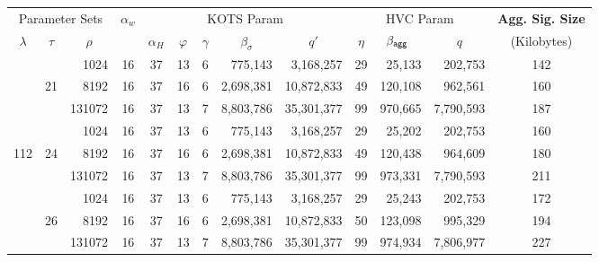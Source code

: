 \begin{table}\centering
    \begin{tabular}{ccr|c|cccrr|crr|c}%
  
      \multicolumn{3}{c|}{Parameter Sets}  
      & \multirow{2}{*}{$\alpha_w$}  
      & \multicolumn{5}{c|}{KOTS Param}  
      & \multicolumn{3}{c|}{HVC Param}  
      &  {\bf Agg. Sig. Size}\\%
      
      $\lambda$      & $\tau$
      & \multicolumn{1}{c|}{$\rho$}&   &$\alpha_H$& $\varphi$ 
      & $\gamma$                      & \multicolumn{1}{c}{$\beta_\sigma$}     
      & \multicolumn{1}{c|}{$q'$}                     & $\eta$       
      & $\beta_{\mathsf{agg}}\quad$                  & \multicolumn{1}{c|}{$q$} 
      & (Kilobytes) \\\toprule
  
  
      &       &   1024 &         16 &        37 &         13 &       6 &        775,143 &  3,168,257 &    29 &       25,133 &   202,753 & 142 \\%
      &    21 &   8192 &         16 &        37 &         16 &       6 &      2,698,381 & 10,872,833 &    49 &      120,108 &   962,561 & 160 \\%
      &       & 131072 &         16 &        37 &         13 &       7 &      8,803,786 & 35,301,377 &    99 &      970,665 & 7,790,593 & 187 \\\cline{2-13}
  
      &       &   1024 &         16 &        37 &         13 &       6 &        775,143 &  3,168,257 &    29 &       25,202 &   202,753 & 160 \\%
  112 &    24 &   8192 &         16 &        37 &         16 &       6 &      2,698,381 & 10,872,833 &    49 &      120,438 &   964,609 & 180 \\%
      &       & 131072 &         16 &        37 &         13 &       7 &      8,803,786 & 35,301,377 &    99 &      973,331 & 7,790,593 & 211 \\\cline{2-13}
  
      &       &   1024 &         16 &        37 &         13 &       6 &        775,143 &  3,168,257 &    29 &       25,243 &   202,753 & 172 \\%
      &    26 &   8192 &         16 &        37 &         16 &       6 &      2,698,381 & 10,872,833 &    50 &      123,098 &   995,329 & 194 \\%
      &       & 131072 &         16 &        37 &         13 &       7 &      8,803,786 & 35,301,377 &    99 &      974,934 & 7,806,977 & 227 \\\midrule
  

\end{tabular}
\end{table}
